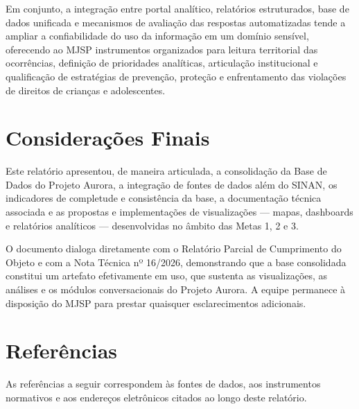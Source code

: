 \documentclass[11pt,a4paper]{article}
\begin{document}
Em conjunto, a integração entre portal analítico, relatórios estruturados, base de dados unificada e mecanismos de avaliação das respostas automatizadas tende a ampliar a confiabilidade do uso da informação em um domínio sensível, oferecendo ao MJSP instrumentos organizados para leitura territorial das ocorrências, definição de prioridades analíticas, articulação institucional e qualificação de estratégias de prevenção, proteção e enfrentamento das violações de direitos de crianças e adolescentes.


\clearpage
\section{Considerações Finais}
\label{sec:consideracoes}

Este relatório apresentou, de maneira articulada, a consolidação da Base de Dados do Projeto Aurora, a integração de fontes de dados além do SINAN, os indicadores de completude e consistência da base, a documentação técnica associada e as propostas e implementações de visualizações — mapas, dashboards e relatórios analíticos — desenvolvidas no âmbito das Metas 1, 2 e 3.

O documento dialoga diretamente com o Relatório Parcial de Cumprimento do Objeto e com a Nota Técnica nº 16/2026, demonstrando que a base consolidada constitui um artefato efetivamente em uso, que sustenta as visualizações, as análises e os módulos conversacionais do Projeto Aurora. A equipe permanece à disposição do MJSP para prestar quaisquer esclarecimentos adicionais.

\clearpage
\section{Referências}
\label{sec:referencias}

As referências a seguir correspondem às fontes de dados, aos instrumentos normativos e aos endereços eletrônicos citados ao longo deste relatório.
\end{document}
